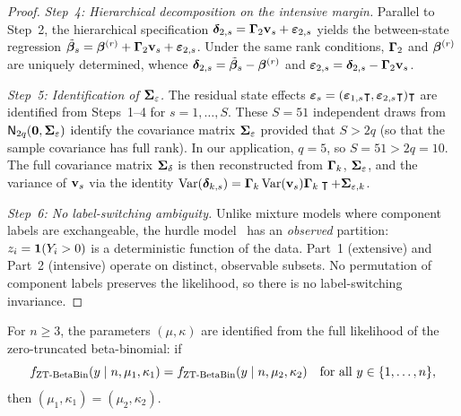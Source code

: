 \begin{proof}
  \medskip\noindent\textit{Step~4: Hierarchical decomposition on the
  intensive margin.}\enspace
  Parallel to Step~2, the hierarchical specification
  $\boldsymbol{\delta}_{2,s} = \boldsymbol{\Gamma}_2\mathbf{v}_s + \boldsymbol{\varepsilon}_{2,s}$ yields the
  between-state regression
  $\tilde{\boldsymbol{\beta}}_s = \boldsymbol{\beta}^{(r)} + \boldsymbol{\Gamma}_2\mathbf{v}_s
  + \boldsymbol{\varepsilon}_{2,s}$.
  Under the same rank conditions, $\boldsymbol{\Gamma}_2$ and $\boldsymbol{\beta}^{(r)}$
  are uniquely determined, whence
  $\boldsymbol{\delta}_{2,s} = \tilde{\boldsymbol{\beta}}_s - \boldsymbol{\beta}^{(r)}$ and
  $\boldsymbol{\varepsilon}_{2,s} = \boldsymbol{\delta}_{2,s} - \boldsymbol{\Gamma}_2\mathbf{v}_s$.

  \medskip\noindent\textit{Step~5: Identification of
  $\boldsymbol{\Sigma}_\varepsilon$.}\enspace
  The residual state effects $\boldsymbol{\varepsilon}_s =
  (\boldsymbol{\varepsilon}_{1,s}\intercal, \boldsymbol{\varepsilon}_{2,s}\intercal)\intercal$ are identified from
  Steps~1--4 for $s = 1,\ldots,S$. These $S = 51$ independent draws from
  $\textsf{N}_{2q}(\mathbf{0}, \boldsymbol{\Sigma}_\varepsilon)$ identify the covariance
  matrix $\boldsymbol{\Sigma}_\varepsilon$ provided that $S > 2q$ (so that the
  sample covariance has full rank). In our application, $q = 5$, so
  $S = 51 > 2q = 10$. The full covariance matrix $\boldsymbol{\Sigma}_\delta$ is
  then reconstructed from $\boldsymbol{\Gamma}_k$, $\boldsymbol{\Sigma}_\varepsilon$, and the
  variance of $\mathbf{v}_s$ via the identity
  $\operatorname*{Var}(\boldsymbol{\delta}_{k,s}) = \boldsymbol{\Gamma}_k\operatorname*{Var}(\mathbf{v}_s)\boldsymbol{\Gamma}_k\intercal +
  \boldsymbol{\Sigma}_{\varepsilon,k}$.

  \medskip\noindent\textit{Step~6: No label-switching ambiguity.}\enspace
  Unlike mixture models where component labels are exchangeable, the
  hurdle model~\citep{Mullahy1986} has an \emph{observed} partition:
  $z_i = \mathbf{1}(Y_i > 0)$
  is a deterministic function of the data. Part~1 (extensive) and Part~2
  (intensive) operate on distinct, observable subsets. No permutation of
  component labels preserves the likelihood, so there is no
  label-switching invariance.
\end{proof}


\begin{proposition}\label{smb:prop-mu-kappa-id}
  For $n \ge 3$, the parameters $(\mu, \kappa)$ are identified from the
  full likelihood of the zero-truncated beta-binomial: if
  \begin{equation}\label{smb:eq-ztbb-id-hypothesis}
    f_{\operatorname{ZT\text{-}BetaBin}}(y \mid n, \mu_1, \kappa_1)
    = f_{\operatorname{ZT\text{-}BetaBin}}(y \mid n, \mu_2, \kappa_2)
    \quad \textup{for all } y \in \{1,\ldots,n\},
  \end{equation}
  then $(\mu_1, \kappa_1) = (\mu_2, \kappa_2)$.
\end{proposition}

